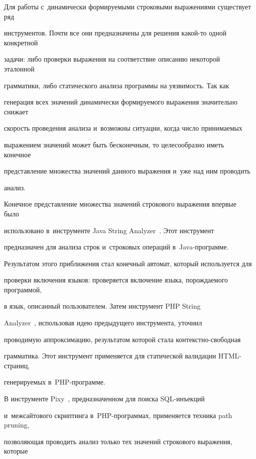 Для работы с~динамически формируемыми строковыми выражениями существует ряд 


инструментов. Почти все они предназначены для решения ка\-кой-то одной конкретной 


задачи: либо проверки выражения на соответствие описанию некоторой эталонной 


грамматики,  либо статического анализа программы на уязвимость. Так как 


генерация всех значений динамически формируемого выражения значительно снижает 


скорость проведения анализа и~возможны ситуации, когда число принимаемых 


выражением значений может быть бесконечным, то  целесообразно иметь конечное 


представление множества значений данного выражения и~уже над ним проводить 


анализ.





Конечное представление множества значений строкового выражения впервые было 


использовано в~инструменте Java String Analyzer~\cite{JSA}. Этот инструмент 


предназначен для анализа строк и~строковых операций в~Java-про\-грам\-ме. 


Результатом этого приближения стал конечный автомат, который используется для 


проверки включения языков: проверяется включение языка, порождаемого программой, 


в язык, описанный пользователем. Затем инструмент PHP String 


Analyzer~\cite{PHPSA}, использовав идею предыдущего инструмента, уточнил 


проводимую аппроксимацию, результатом которой стала кон\-текст\-но-сво\-бод\-ная 


грамматика. Этот инструмент применяется для статической валидации HTML-стра\-ниц, 


генерируемых в~PHP-про\-грамме.





В инструменте Pixy~\cite{Pixy}, предназначенном для поиска SQL-инъекций  


и~межсайтового скриптинга в~PHP-про\-грам\-мах, применяется техника path pruning, 


позволяющая проводить анализ только тех значений строкового выражения, которые 


